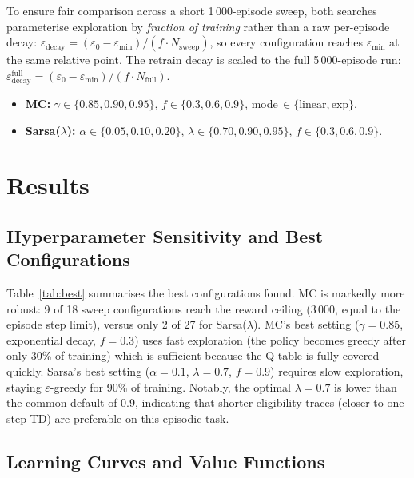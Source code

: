 \documentclass[runningheads]{llncs}
\begin{document}
To ensure fair comparison across a short 1\,000-episode sweep, both searches
parameterise exploration by \emph{fraction of training} rather than a raw
per-episode decay: $\varepsilon_\text{decay}
  = (\varepsilon_0 - \varepsilon_\text{min}) / (f \cdot N_\text{sweep})$,
so every configuration reaches $\varepsilon_\text{min}$ at the same relative
point.
The retrain decay is scaled to the full 5\,000-episode run:
$\varepsilon_\text{decay}^\text{full}
  = (\varepsilon_0 - \varepsilon_\text{min}) / (f \cdot N_\text{full})$.

\begin{itemize}
  \item \textbf{MC:} $\gamma\!\in\!\{0.85,0.90,0.95\}$,
        $f\!\in\!\{0.3,0.6,0.9\}$, mode\,$\in\!\{\text{linear},\text{exp}\}$.
  \item \textbf{Sarsa($\lambda$):} $\alpha\!\in\!\{0.05,0.10,0.20\}$,
        $\lambda\!\in\!\{0.70,0.90,0.95\}$,
        $f\!\in\!\{0.3,0.6,0.9\}$.
\end{itemize}

\section{Results}

\subsection{Hyperparameter Sensitivity and Best Configurations}

Table~\ref{tab:best} summarises the best configurations found.
MC is markedly more robust: 9 of 18 sweep configurations reach the reward
ceiling (3\,000, equal to the episode step limit), versus only 2 of 27 for
Sarsa($\lambda$).
MC's best setting ($\gamma=0.85$, exponential decay, $f=0.3$) uses fast
exploration (the policy becomes greedy after only 30\% of training) which
is sufficient because the Q-table is fully covered quickly.
Sarsa's best setting ($\alpha=0.1$, $\lambda=0.7$, $f=0.9$) requires slow
exploration, staying $\varepsilon$-greedy for 90\% of training.
Notably, the optimal $\lambda=0.7$ is lower than the common default of 0.9,
indicating that shorter eligibility traces (closer to one-step TD) are
preferable on this episodic task.

\subsection{Learning Curves and Value Functions}
\end{document}
